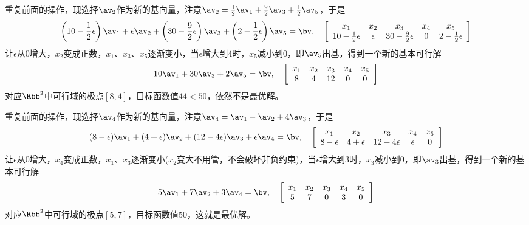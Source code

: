 \documentclass{ctexart}
\begin{document}
\begin{example}
    重复前面的操作，现选择$\av_2$作为新的基向量，注意$\av_2 = \frac{1}{2} \av_1 + \frac{9}{2} \av_3 + \frac{1}{2} \av_5$，于是
    \begin{align*}
        \left( 10 - \frac{1}{2} \epsilon \right) \av_1 + \epsilon \av_2 + \left( 30 - \frac{9}{2} \epsilon \right) \av_3 + \left( 2 - \frac{1}{2} \epsilon \right) \av_5 = \bv, \quad
        \left[ \begin{array}{ccccc}
                       x_1                       & x_2      & x_3                       & x_4 & x_5                      \\
                       10 - \frac{1}{2} \epsilon & \epsilon & 30 - \frac{9}{2} \epsilon & 0   & 2 - \frac{1}{2} \epsilon
                   \end{array} \right]
    \end{align*}
    让$\epsilon$从$0$增大，$x_2$变成正数，$x_1$、$x_3$、$x_5$逐渐变小，当$\epsilon$增大到$4$时，$x_5$减小到$0$，即$\av_5$出基，得到一个新的基本可行解
    \begin{align*}
        10 \av_1 + 30 \av_3 + 2 \av_5 = \bv, \quad
        \left[ \begin{array}{ccccc}
                       x_1 & x_2 & x_3 & x_4 & x_5 \\
                       8   & 4   & 12  & 0   & 0
                   \end{array} \right]
    \end{align*}
    对应$\Rbb^2$中可行域的极点$[8,4]$，目标函数值$44 < 50$，依然不是最优解。

    重复前面的操作，现选择$\av_4$作为新的基向量，注意$\av_4 = \av_1 - \av_2 + 4 \av_3$，于是
    \begin{align*}
        (8 - \epsilon) \av_1 + (4 + \epsilon) \av_2 + (12 - 4 \epsilon) \av_3 + \epsilon \av_4 = \bv, \quad
        \left[ \begin{array}{ccccc}
                       x_1          & x_2          & x_3             & x_4      & x_5 \\
                       8 - \epsilon & 4 + \epsilon & 12 - 4 \epsilon & \epsilon & 0
                   \end{array} \right]
    \end{align*}
    让$\epsilon$从$0$增大，$x_4$变成正数，$x_1$、$x_3$逐渐变小($x_2$变大不用管，不会破坏非负约束)，当$\epsilon$增大到$3$时，$x_3$减小到$0$，即$\av_3$出基，得到一个新的基本可行解
    \begin{align*}
        5 \av_1 + 7 \av_2 + 3 \av_4 = \bv, \quad
        \left[ \begin{array}{ccccc}
                       x_1 & x_2 & x_3 & x_4 & x_5 \\
                       5   & 7   & 0   & 3   & 0
                   \end{array} \right]
    \end{align*}
    对应$\Rbb^2$中可行域的极点$[5,7]$，目标函数值$50$，这就是最优解。
\end{example}
\end{document}
